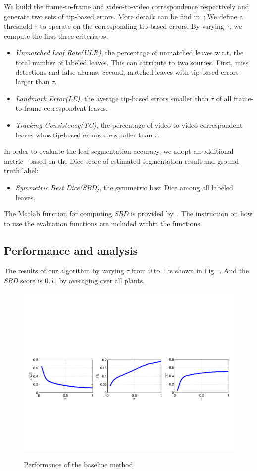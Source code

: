 We build the frame-to-frame and video-to-video correspondence respectively and generate two sets of tip-based errors.
More details can be find in~\cite{};
We define a threshold $\tau$ to operate on the corresponding tip-based errors.
By varying $\tau$, we compute the first three criteria as:
\begin{itemize}
  \item {\it{Unmatched Leaf Rate(ULR)}}, the percentage of unmatched leaves w.r.t. the total number of labeled leaves. This can attribute to two sources. First, miss detections and false alarms. Second, matched leaves with tip-based errors larger than $\tau$.
  \item {\it{Landmark Error(LE)}}, the average tip-based errors smaller than $\tau$ of all frame-to-frame correspondent leaves.
  \item {\it{Tracking Consistency(TC)}}, the percentage of video-to-video correspondent leaves whos tip-based errors are smaller than $\tau$.
\end{itemize}

In order to evaluate the leaf segmentation accuracy, we adopt an additional metric~\cite{scharr2014annotated} based on the Dice score of estimated segmentation result and ground truth label:
\begin{itemize}
  \item {\it{Symmetric Best Dice(SBD)}}, the symmetric best Dice among all labeled leaves.
\end{itemize}

The Matlab function for computing {\it{SBD}} is provided by~\cite{scharr2014annotated}.
The instruction on how to use the evaluation functions are included within the functions.


\subsection{Performance and analysis}
The results of our algorithm by varying $\tau$ from 0 to 1 is shown in Fig.~.
And the {\it{SBD}} score is $0.51$ by averaging over all plants.

\begin{figure}[h]
\centering
\includegraphics[width=.98\textwidth]{Figures/performance}\\
\caption{Performance of the baseline method.}
\label{fig:performance}
\end{figure}



